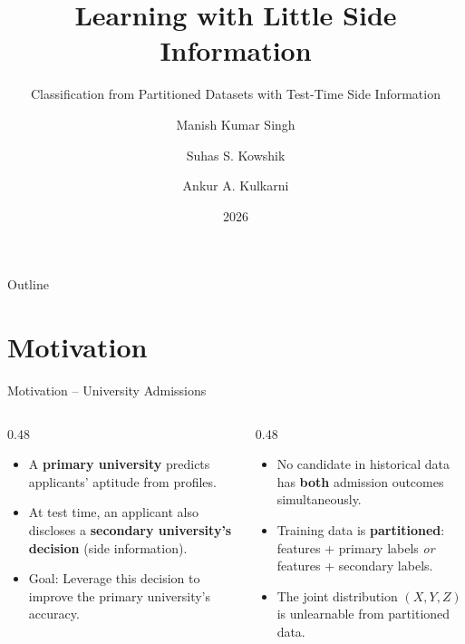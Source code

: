 \documentclass[aspectratio=169,xcolor={dvipsnames,table}]{beamer}
\title{Learning with Little Side Information}
\subtitle{Classification from Partitioned Datasets with Test-Time Side Information}
\author{Manish Kumar Singh \and Suhas S. Kowshik \and Ankur A. Kulkarni}
\institute{IIT Bombay \and Microsoft \and IIT Bombay}
\date{2026}
\begin{document}
\begin{frame}
    \titlepage
\end{frame}

\begin{frame}{Outline}
    \tableofcontents
\end{frame}

\section{Motivation}
\begin{frame}{Motivation -- University Admissions}
    \begin{columns}[T]
        \begin{column}{0.48\textwidth}
            \begin{tcolorbox}[colback=CyanPrimary!5,colframe=CyanPrimary,title=\textbf{The Scenario}]
                \begin{itemize}
                    \item A \textbf{primary university} predicts applicants' aptitude from profiles.
                    \item At test time, an applicant also discloses a \textbf{secondary university's decision} (\alert{side information}).
                    \item Goal: Leverage this decision to improve the primary university's accuracy.
                \end{itemize}
            \end{tcolorbox}
        \end{column}
        \begin{column}{0.48\textwidth}
            \begin{tcolorbox}[colback=AccentPink!5,colframe=AccentPink,title=\textbf{The Challenge}]
                \begin{itemize}
                    \item No candidate in historical data has \textbf{both} admission outcomes simultaneously.
                    \item Training data is \textbf{partitioned}: features + primary labels \emph{or} features + secondary labels.
                    \item The joint distribution $(X,Y,Z)$ is \alert{unlearnable} from partitioned data.
                \end{itemize}
            \end{tcolorbox}
        \end{column}
    \end{columns}
\end{frame}
\end{document}
